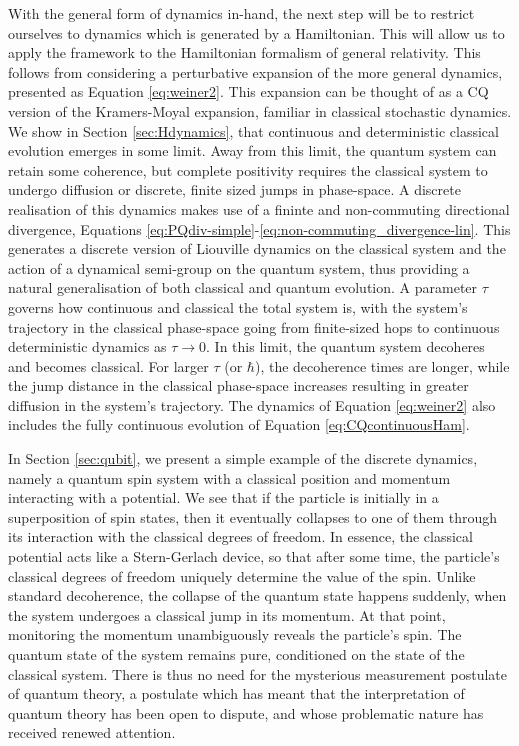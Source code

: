 \documentclass[aps,pra,showpacs,citeautoscript,amsmath,amssymb,floatfix,superscriptaddress,bbm, verbatim,amsfonts,changes,10pt,nofootinbib,longbibliography]{revtex4-1}
\begin{document}
With the general form of dynamics in-hand, the next step will be to restrict ourselves to dynamics which is generated by a Hamiltonian. This will allow us to apply the framework to the Hamiltonian formalism of general relativity. %
This follows from considering a perturbative expansion of the more general dynamics, presented as Equation \eqref{eq:weiner2}.  This expansion can be thought of as a CQ version of the Kramers-Moyal expansion\cite{kramers1940brownian,moyal1949stochastic}, familiar in classical stochastic dynamics.
We show in Section \ref{sec:Hdynamics}, that continuous and deterministic classical evolution emerges in some limit. 
Away from this limit, the quantum system can retain some coherence, but complete positivity requires the classical system to undergo diffusion or discrete, finite sized jumps in phase-space. 
A discrete realisation of this dynamics makes use of a fininte and non-commuting directional divergence, Equations \eqref{eq:PQdiv-simple}-\eqref{eq:non-commuting_divergence-lin}. This generates 
a discrete version of Liouville dynamics on the classical system and the action of a dynamical semi-group on the quantum system, thus providing a natural generalisation of both classical and quantum evolution. 
A parameter $\tau$ governs how continuous and classical the total system is, with the system's trajectory in the classical phase-space going from finite-sized hops to continuous deterministic dynamics as $\tau\rightarrow 0$. In this limit, the quantum system decoheres and becomes classical. For larger $\tau$ (or $\hbar$), the decoherence times are longer, while the jump distance in the classical phase-space increases resulting in greater diffusion in the system's trajectory. The dynamics of Equation \eqref{eq:weiner2} also includes the fully continuous evolution of Equation \eqref{eq:CQcontinuousHam}.

In Section \ref{sec:qubit}, we present a simple example of the discrete dynamics, namely a quantum spin system with a classical position and momentum interacting with a potential. We see that if the particle is initially in a superposition of spin states, then it eventually collapses to one of them through its interaction with the classical degrees of freedom. In essence, the classical potential acts like  a Stern-Gerlach device, so that after some time, the particle's classical degrees of freedom uniquely determine the value of the spin. Unlike standard decoherence, the collapse of the quantum state happens suddenly, when the system undergoes a classical jump in its momentum. At that point, monitoring the momentum unambiguously reveals the particle's spin. The quantum state of the system remains pure, conditioned on the state of the classical system. There is thus no need for the mysterious measurement postulate of quantum theory, a postulate which has meant that the interpretation of quantum theory has been open to dispute, and whose problematic nature has  received renewed attention\cite{frauchiger2016single}.
\end{document}
